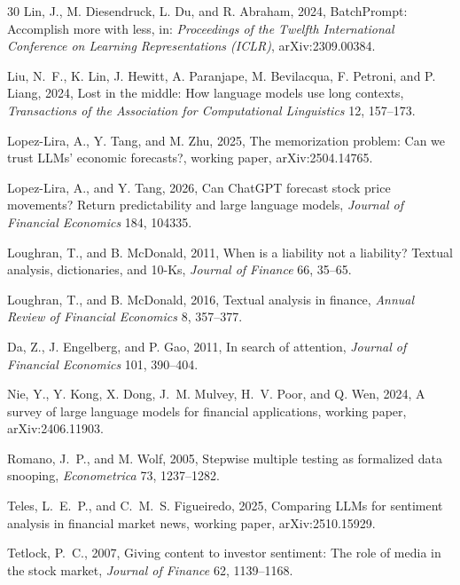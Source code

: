 \begin{thebibliography}{30}
Lin, J., M. Diesendruck, L. Du, and R. Abraham, 2024, {B}atch{P}rompt: {A}ccomplish more with less, in: \emph{Proceedings of the Twelfth International Conference on Learning Representations (ICLR)}, arXiv:2309.00384.

Liu, N.~F., K. Lin, J. Hewitt, A. Paranjape, M. Bevilacqua, F. Petroni, and P. Liang, 2024, Lost in the middle: {H}ow language models use long contexts, \emph{Transactions of the Association for Computational Linguistics} 12, 157--173.

Lopez-Lira, A., Y. Tang, and M. Zhu, 2025, The memorization problem: {C}an we trust {LLM}s' economic forecasts?, working paper, arXiv:2504.14765.

Lopez-Lira, A., and Y. Tang, 2026, Can {ChatGPT} forecast stock price movements? {R}eturn predictability and large language models, \emph{Journal of Financial Economics} 184, 104335.

Loughran, T., and B. McDonald, 2011, When is a liability not a liability? {T}extual analysis, dictionaries, and 10-{K}s, \emph{Journal of Finance} 66, 35--65.

Loughran, T., and B. McDonald, 2016, Textual analysis in finance, \emph{Annual Review of Financial Economics} 8, 357--377.

Da, Z., J. Engelberg, and P. Gao, 2011, In search of attention, \emph{Journal of Financial Economics} 101, 390--404.

Nie, Y., Y. Kong, X. Dong, J.~M. Mulvey, H.~V. Poor, and Q. Wen, 2024, A survey of large language models for financial applications, working paper, arXiv:2406.11903.

Romano, J.~P., and M. Wolf, 2005, Stepwise multiple testing as formalized data snooping, \emph{Econometrica} 73, 1237--1282.

Teles, L.~E.~P., and C.~M.~S. Figueiredo, 2025, Comparing {LLM}s for sentiment analysis in financial market news, working paper, arXiv:2510.15929.

Tetlock, P.~C., 2007, Giving content to investor sentiment: {T}he role of media in the stock market, \emph{Journal of Finance} 62, 1139--1168.


\end{thebibliography}
